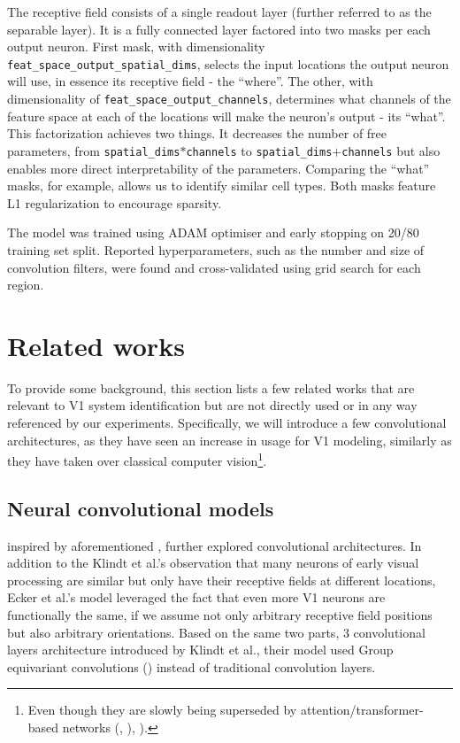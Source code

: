The receptive field consists of a single readout layer (further referred to as the separable layer). It is a fully connected layer factored into two masks per each output neuron. First mask, with dimensionality \texttt{feat\_space\_output\_spatial\_dims}, selects the input locations the output neuron will use, in essence its receptive field - the “where”. The other, with dimensionality of \texttt{feat\_space\_output\_channels}, determines what channels of the feature space at each of the locations will make the neuron’s output - its “what”. This factorization achieves two things. It decreases the number of free parameters, from \texttt{spatial\_dims}$*$\texttt{channels} to \texttt{spa\-tial\_dims}$+$\texttt{channels} but also enables more direct interpretability of the parameters. Comparing the “what” masks, for example, allows us to identify similar cell types. Both masks feature L1 regularization to encourage sparsity.

The model was trained using ADAM optimiser and early stopping on 20/80 training set split. Reported hyperparameters, such as the number and size of convolution filters, were found and cross-validated using grid search for each region.

\section{Related works}\label{ch:2.3}
To provide some background, this section lists a few related works that are relevant to V1 system identification but are not directly used or in any way referenced by our experiments. Specifically, we will introduce a few convolutional architectures, as they have seen an increase in usage for V1 modeling, similarly as they have taken over classical computer vision\footnote{Even though they are slowly being superseded by attention/transformer-based networks (\cite{2019arXiv190605909R}, \cite{2019arXiv190409925B}), \cite{dosovitskiy2020image}).}.

\subsection{Neural convolutional models}
\cite{ecker} inspired by aforementioned \cite{klindt}, further explored convolutional architectures. In addition to the Klindt et al.’s observation that many neurons of early visual processing are similar but only have their receptive fields at different locations, Ecker et al.’s model leveraged the fact that even more V1 neurons are functionally the same, if we assume not only arbitrary receptive field positions but also arbitrary orientations. Based on the same two parts, 3 convolutional layers architecture introduced by Klindt et al., their model used Group equivariant convolutions (\cite{2016arXiv160207576C}) instead of traditional convolution layers.

